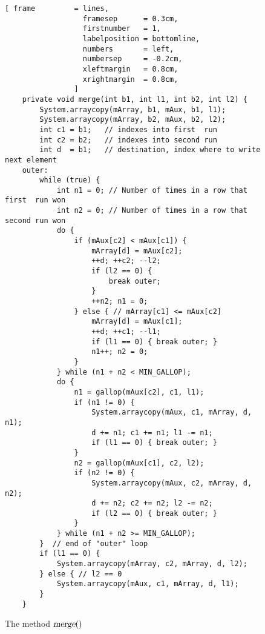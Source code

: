 \begin{figure}[!ht]
\centering
\begin{Verbatim}[ frame         = lines, 
                  framesep      = 0.3cm, 
                  firstnumber   = 1,
                  labelposition = bottomline,
                  numbers       = left,
                  numbersep     = -0.2cm,
                  xleftmargin   = 0.8cm,
                  xrightmargin  = 0.8cm,
                ]
    private void merge(int b1, int l1, int b2, int l2) {
        System.arraycopy(mArray, b1, mAux, b1, l1);
        System.arraycopy(mArray, b2, mAux, b2, l2);
        int c1 = b1;   // indexes into first  run
        int c2 = b2;   // indexes into second run 
        int d  = b1;   // destination, index where to write next element
    outer:
        while (true) {
            int n1 = 0; // Number of times in a row that first  run won
            int n2 = 0; // Number of times in a row that second run won
            do {
                if (mAux[c2] < mAux[c1]) {
                    mArray[d] = mAux[c2];
                    ++d; ++c2; --l2;
                    if (l2 == 0) { 
                        break outer;
                    }
                    ++n2; n1 = 0;
                } else { // mArray[c1] <= mAux[c2]
                    mArray[d] = mAux[c1];
                    ++d; ++c1; --l1;
                    if (l1 == 0) { break outer; }
                    n1++; n2 = 0;
                }
            } while (n1 + n2 < MIN_GALLOP);
            do {
                n1 = gallop(mAux[c2], c1, l1);
                if (n1 != 0) {
                    System.arraycopy(mAux, c1, mArray, d, n1);
                    d += n1; c1 += n1; l1 -= n1;
                    if (l1 == 0) { break outer; }
                }
                n2 = gallop(mAux[c1], c2, l2);
                if (n2 != 0) {
                    System.arraycopy(mAux, c2, mArray, d, n2);
                    d += n2; c2 += n2; l2 -= n2;
                    if (l2 == 0) { break outer; }
                }
            } while (n1 + n2 >= MIN_GALLOP);
        }  // end of "outer" loop
        if (l1 == 0) {
            System.arraycopy(mArray, c2, mArray, d, l2);
        } else { // l2 == 0
            System.arraycopy(mAux, c1, mArray, d, l1);
        }
    }
\end{Verbatim}
\vspace*{-0.3cm}
\caption{The method $\textsl{merge}()$}
\label{fig:TimSort.java:merge}
\end{figure}

